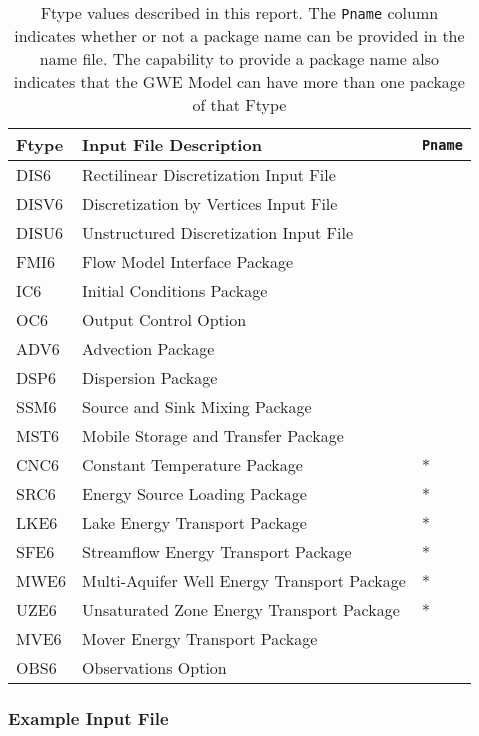 \begin{table}[H]
\caption{Ftype values described in this report.  The \texttt{Pname} column indicates whether or not a package name can be provided in the name file.  The capability to provide a package name also indicates that the GWE Model can have more than one package of that Ftype}
\small
\begin{center}
\begin{tabular*}{\columnwidth}{l l l}
\hline
\hline
Ftype & Input File Description & \texttt{Pname}\\
\hline
DIS6 & Rectilinear Discretization Input File \\
DISV6 & Discretization by Vertices Input File \\
DISU6 & Unstructured Discretization Input File \\
FMI6 & Flow Model Interface Package &  \\ 
IC6 & Initial Conditions Package \\
OC6 & Output Control Option \\
ADV6 & Advection Package \\ 
DSP6 & Dispersion Package \\ 
SSM6 & Source and Sink Mixing Package \\ 
MST6 & Mobile Storage and Transfer Package \\
CNC6 & Constant Temperature Package & * \\ 
SRC6 & Energy Source Loading Package & * \\ 
LKE6 & Lake Energy Transport Package & * \\ 
SFE6 & Streamflow Energy Transport Package & * \\ 
MWE6 & Multi-Aquifer Well Energy Transport Package & * \\ 
UZE6 & Unsaturated Zone Energy Transport Package & * \\ 
MVE6 & Mover Energy Transport Package \\ 
OBS6 & Observations Option \\
\hline 
\end{tabular*}
\label{table:ftype}
\end{center}
\normalsize
\end{table}

\vspace{5mm}
\subsubsection{Example Input File}


